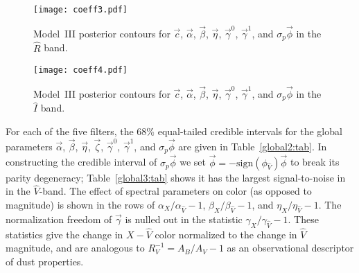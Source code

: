 \documentclass[trackchanges]{aastex62}   	%
\begin{document}
\begin{figure}[htbp] %
   \centering
      \texttt{[image: coeff3.pdf]} 
            \caption{Model~III posterior contours for  $\vec{c}$, $\vec{\alpha}$, $\vec{\beta}$, $\vec{\eta}$,  $\vec{\gamma}^0$, $\vec{\gamma}^1$, and $\sigma_p \vec{\phi}$ in the ${\hat{R}}$ band.
 \label{global4:fig}}
\end{figure}

\begin{figure}[htbp] %
   \centering
         \texttt{[image: coeff4.pdf]} 
            \caption{Model~III posterior contours for  $\vec{c}$, $\vec{\alpha}$, $\vec{\beta}$, $\vec{\eta}$, $\vec{\gamma}^0$, $\vec{\gamma}^1$, and $\sigma_p \vec{\phi}$ in the ${\hat{I}}$ band.
 \label{global5:fig}}
\end{figure}


For each of the five filters, the 68\%  equal-tailed credible intervals for the global parameters $\vec{\alpha}$, $\vec{\beta}$, $\vec{\eta}$, $\vec{\zeta}$,
$\vec{\gamma}^0$, $\vec{\gamma}^1$, and $\sigma_p\vec{\phi}$
are given in Table~\ref{global2:tab}.
In constructing the credible interval of $\sigma_p\vec{\phi}$ 
we set $\vec{\phi} = -\text{sign}(\phi_{\hat{V}}) \vec{\phi}$ to break its parity degeneracy;
Table~\ref{global3:tab} shows it has the largest signal-to-noise in
in the $\hat{V}$-band.
The effect of spectral parameters on color (as opposed to magnitude)
is shown in the rows of $\alpha_X/\alpha_{\hat{V}}-1$,  $\beta_X/\beta_{\hat{V}}-1$, and  $\eta_X/\eta_{\hat{V}}-1$.
The normalization freedom of $\vec{\gamma}$ is nulled out in the statistic
 $\gamma_X/\gamma_{\hat{V}}-1$.
 These statistics give the change in $X-\hat{V}$ color normalized to the change in $\hat{V}$ magnitude, and are analogous to
$R_V^{-1}=A_B/A_V-1$ as an observational descriptor of dust properties.
\end{document}
